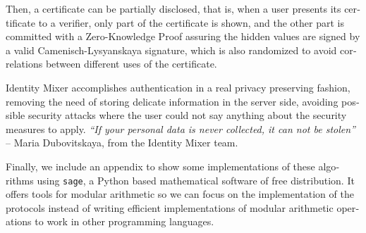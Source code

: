 \begin{otherlanguage}{english}
Then, a certificate can be partially disclosed, that is, when a user presents its certificate to a verifier, only part of the certificate is shown, and the other part is committed with a Zero-Knowledge Proof assuring the hidden values are signed by a valid Camenisch-Lysyanskaya signature, which is also randomized to avoid correlations between different uses of the certificate.

Identity Mixer accomplishes authentication in a real privacy preserving fashion, removing the need of storing delicate information in the server side, avoiding possible security attacks where the user could not say anything about the security measures to apply. \textit{``If your personal data is never collected, it can not be stolen''} -- Maria Dubovitskaya, from the Identity Mixer team.


Finally, we include an appendix to show some implementations of these algorithms using \texttt{sage}, a Python based mathematical software of free distribution. It offers tools for modular arithmetic so we can focus on the implementation of the protocols instead of writing efficient implementations of modular arithmetic operations to work in other programming languages.

















\end{otherlanguage}

\endgroup			

\vfill